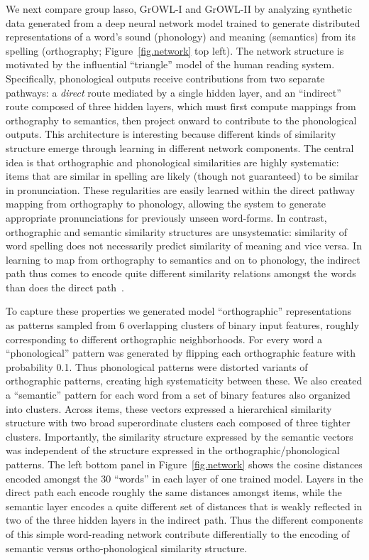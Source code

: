 We next compare group lasso, GrOWL-I and GrOWL-II by analyzing synthetic data generated
from a deep neural network model trained to generate distributed representations of a
word's sound (phonology) and meaning (semantics) from its spelling (orthography;
Figure~\ref{fig.network} top left). The network structure is motivated by the influential
``triangle'' model of the human reading system\cite{PlautETAL96}. Specifically,
phonological outputs receive contributions from two separate pathways: a {\em direct} route
mediated by a single hidden layer, and an ``indirect'' route composed of three hidden
layers, which must first compute mappings from orthography to semantics, then project
onward to contribute to the phonological outputs. This architecture is interesting because
different kinds of similarity structure emerge through learning in different network
components. The central idea is that orthographic and phonological similarities are highly
systematic: items that are similar in spelling are likely (though not guaranteed) to be
similar in pronunciation. These regularities are easily learned within the direct pathway
mapping from orthography to phonology, allowing the system to generate appropriate
pronunciations for previously unseen word-forms. In contrast, orthographic and semantic
similarity structures are unsystematic: similarity of word spelling does not necessarily
predict similarity of meaning and vice versa. In learning to map from orthography to
semantics and on to phonology, the indirect path thus comes to encode quite different
similarity relations amongst the words than does the direct
path~\cite{PlautETAL96,HarmSeidenberg04}.

To capture these properties we generated model ``orthographic'' representations as patterns
sampled from 6 overlapping clusters of binary input features, roughly corresponding to
different orthographic neighborhoods. For every word a ``phonological'' pattern was
generated by flipping each orthographic feature with probability 0.1. Thus phonological
patterns were distorted variants of orthographic patterns, creating high systematicity
between these. We also created a ``semantic'' pattern for each word from a set of binary
features also organized into clusters. Across items, these vectors expressed a hierarchical
similarity structure with two broad superordinate clusters each composed of three tighter
clusters. Importantly, the similarity structure expressed by the semantic vectors was
independent of the structure expressed in the orthographic/phonological patterns. The left
bottom panel in Figure~\ref{fig.network} shows the cosine distances encoded amongst the 30
``words'' in each layer of one trained model. Layers in the direct path each encode roughly
the same distances amongst items, while the semantic layer encodes a quite different set of
distances that is weakly reflected in two of the three hidden layers in the indirect path.
Thus the different components of this simple word-reading network contribute differentially
to the encoding of semantic versus ortho-phonological similarity structure.

